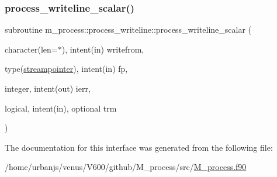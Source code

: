 \mbox{\label{interfacem__process_1_1process__writeline_a9e95166556bec54fd10568f01d02f34e}} 
\subsubsection{\texorpdfstring{process\+\_\+writeline\+\_\+scalar()}{process\_writeline\_scalar()}}
{\footnotesize\ttfamily subroutine m\+\_\+process\+::process\+\_\+writeline\+::process\+\_\+writeline\+\_\+scalar (\begin{DoxyParamCaption}\item[{character(len=$\ast$), intent(in)}]{writefrom,  }\item[{type(\mbox{\hyperlink{structm__process_1_1streampointer}{streampointer}}), intent(in)}]{fp,  }\item[{integer, intent(out)}]{ierr,  }\item[{logical, intent(in), optional}]{trm }\end{DoxyParamCaption})\hspace{0.3cm}{\ttfamily [private]}}



The documentation for this interface was generated from the following file\+:\begin{DoxyCompactItemize}
\item 
/home/urbanjs/venus/\+V600/github/\+M\+\_\+process/src/\mbox{\hyperlink{M__process_8f90}{M\+\_\+process.\+f90}}\end{DoxyCompactItemize}
